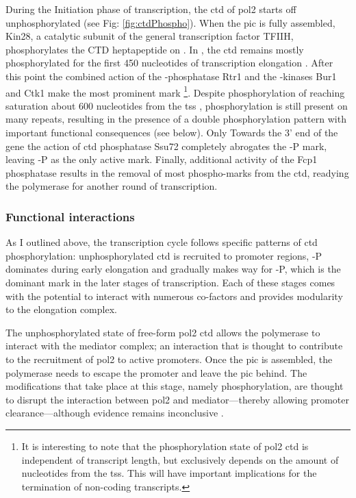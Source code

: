 During the Initiation phase of transcription, the \gls{ctd} of \gls{pol2} starts off unphosphorylated (see Fig: \ref{fig:ctdPhospho}).
When the \gls{pic} is fully assembled, Kin28, a catalytic subunit of the general transcription factor TFIIH, phosphorylates the CTD heptapeptide on \serf{}.
In \cer{}, the \gls{ctd} remains mostly \serf{} phosphorylated for the first 450 nucleotides of transcription elongation \citep{mayer:2010:uniform}. 
After this point the combined action of the \serf{}-phosphatase Rtr1 \citep{mosley:2009:rtr1, hunter:2016:phosphatase} and the \sert{}-kinases Bur1 and Ctk1 \citep{qiu:2009:phosphorylation} make \sert{} the most prominent mark \footnote{
It is interesting to note that the phosphorylation state of \gls{pol2} \gls{ctd} is independent of transcript length, but exclusively depends on the amount of nucleotides from the \gls{tss}. 
This will have important implications for the termination of non-coding transcripts.}.
Despite phosphorylation of \sert{} reaching saturation about 600 nucleotides from the \gls{tss} \citep{mayer:2010:uniform}, \serf{} phosphorylation is still present on many repeats, resulting in the presence of a double phosphorylation pattern with important functional consequences (see below).
Only Towards the 3' end of the gene the action of \gls{ctd} phosphatase Ssu72 completely abrogates the \serf{}-P mark, leaving \sert{}-P as the only active mark.
Finally, additional activity of the Fcp1 phosphatase results in the removal of most phospho-marks from the \gls{ctd}, readying the polymerase for another round of transcription.

\subsubsection{Functional interactions}

As I outlined above, the transcription cycle follows specific patterns of \gls{ctd} phosphorylation: unphosphorylated \gls{ctd} is recruited to promoter regions, \serf{}-P dominates during early elongation and gradually makes way for \sert{}-P, which is the dominant mark in the later stages of transcription. Each of these stages comes with the potential to interact with numerous co-factors and provides modularity to the elongation complex.

The unphosphorylated state of free-form \gls{pol2} \gls{ctd} allows the polymerase to interact with the mediator complex; an interaction that is thought to contribute to the recruitment of \gls{pol2} to active promoters. 
Once the \gls{pic} is assembled, the polymerase needs to escape the promoter and leave the \acrlong{pic} behind.
The modifications that take place at this stage, namely \serf{} phosphorylation, are thought to disrupt the interaction between \gls{pol2} and mediator---thereby allowing promoter clearance---although evidence remains inconclusive \citep{so:2007:hyperphosphorylation, davis:2002:structure}.

